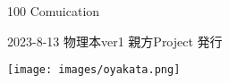 \clearpage{\thispagestyle{empty}}
\begin{center}

\vspace{120pt}

\begin{sffamily}
\Large
100 Comuication
\normalsize
\end{sffamily}
\vspace{320pt}

\begin{sffamily}
2023-8-13
\hspace{5pt}
物理本ver1
\hspace{5pt}
親方Project
\hspace{5pt}
発行
\end{sffamily}

\texttt{[image: images/oyakata.png]}

\end{center}
